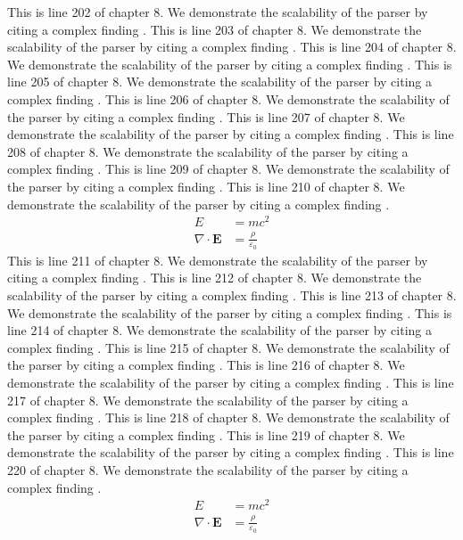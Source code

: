 This is line 202 of chapter 8. We demonstrate the scalability of the parser by citing a complex finding \cite{ref8_202}.
This is line 203 of chapter 8. We demonstrate the scalability of the parser by citing a complex finding \cite{ref8_203}.
This is line 204 of chapter 8. We demonstrate the scalability of the parser by citing a complex finding \cite{ref8_204}.
This is line 205 of chapter 8. We demonstrate the scalability of the parser by citing a complex finding \cite{ref8_205}.
This is line 206 of chapter 8. We demonstrate the scalability of the parser by citing a complex finding \cite{ref8_206}.
This is line 207 of chapter 8. We demonstrate the scalability of the parser by citing a complex finding \cite{ref8_207}.
This is line 208 of chapter 8. We demonstrate the scalability of the parser by citing a complex finding \cite{ref8_208}.
This is line 209 of chapter 8. We demonstrate the scalability of the parser by citing a complex finding \cite{ref8_209}.
This is line 210 of chapter 8. We demonstrate the scalability of the parser by citing a complex finding \cite{ref8_210}.
\begin{align*}
  E &= mc^2 \\
  \nabla \cdot \mathbf{E} &= \frac{\rho}{\varepsilon_0}
\end{align*}
This is line 211 of chapter 8. We demonstrate the scalability of the parser by citing a complex finding \cite{ref8_211}.
This is line 212 of chapter 8. We demonstrate the scalability of the parser by citing a complex finding \cite{ref8_212}.
This is line 213 of chapter 8. We demonstrate the scalability of the parser by citing a complex finding \cite{ref8_213}.
This is line 214 of chapter 8. We demonstrate the scalability of the parser by citing a complex finding \cite{ref8_214}.
This is line 215 of chapter 8. We demonstrate the scalability of the parser by citing a complex finding \cite{ref8_215}.
This is line 216 of chapter 8. We demonstrate the scalability of the parser by citing a complex finding \cite{ref8_216}.
This is line 217 of chapter 8. We demonstrate the scalability of the parser by citing a complex finding \cite{ref8_217}.
This is line 218 of chapter 8. We demonstrate the scalability of the parser by citing a complex finding \cite{ref8_218}.
This is line 219 of chapter 8. We demonstrate the scalability of the parser by citing a complex finding \cite{ref8_219}.
This is line 220 of chapter 8. We demonstrate the scalability of the parser by citing a complex finding \cite{ref8_220}.
\begin{align*}
  E &= mc^2 \\
  \nabla \cdot \mathbf{E} &= \frac{\rho}{\varepsilon_0}
\end{align*}
